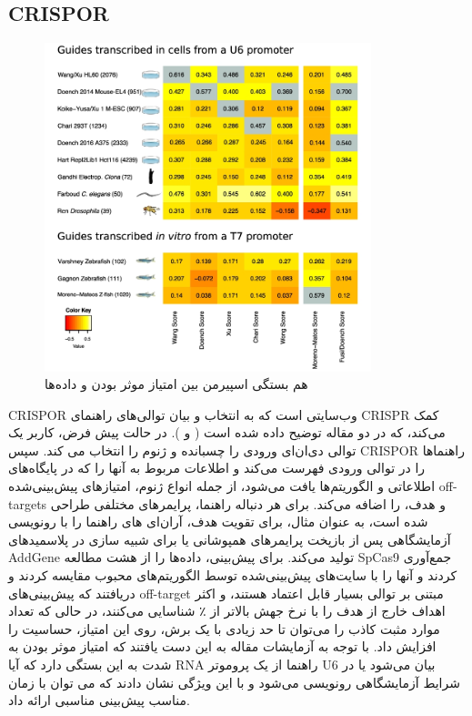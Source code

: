 \documentclass[12pt,a4paper,BCOR=.7cm,headsepline,bibliography=totoc]{report}
\begin{document}
\subsection{CRISPOR~\cite{CRISPOR}}
\begin{figure}
\centering
\includegraphics[width=9.5cm, ]{pictures/CRISPOR.jpg}
\caption{
هم بستگی اسپیرمن بین امتیاز موثر بودن و داده‌ها	\cite{CRISPOR}
}\label{wrap-fig:4}
\end{figure}
CRISPOR
 وب‌سایتی است که به انتخاب و بیان توالی‌های راهنمای CRISPR کمک می‌کند، که در دو مقاله توضیح داده شده است (  و  ). در حالت پیش فرض، کاربر یک توالی دی‌ان‌ای ورودی را چسبانده و ژنوم را انتخاب می کند. سپس CRISPOR راهنماها را در توالی ورودی فهرست می‌کند و اطلاعات مربوط به آنها را که در پایگاه‌های اطلاعاتی و الگوریتم‌ها یافت می‌شود، از جمله انواع ژنوم، امتیازهای پیش‌بینی‌شده off-targets و هدف، را اضافه می‌کند. برای هر دنباله راهنما، پرایمرهای مختلفی طراحی شده است، به عنوان مثال، برای تقویت هدف، آر‌ان‌ای های راهنما را با رونویسی آزمایشگاهی پس از بازپخت پرایمرهای همپوشانی یا برای شبیه سازی در پلاسمیدهای AddGene تولید می‌کند.
برای پیش‌بینی، داده‌ها را از هشت مطالعه  SpCas9 جمع‌آوری کردند و آنها را با سایت‌های پیش‌بینی‌شده توسط الگوریتم‌های محبوب مقایسه کردند و دریافتند که پیش‌بینی‌های off-target مبتنی بر توالی بسیار قابل اعتماد هستند، و اکثر اهداف خارج از هدف را با نرخ جهش بالاتر از ٪ شناسایی می‌کنند، در حالی که تعداد موارد مثبت کاذب را می‌توان تا حد زیادی با یک برش، روی این امتیاز، حساسیت را افزایش داد. با توجه به آزمایشات مقاله به این دست یافتند که امتیاز موثر بودن به شدت به این بستگی دارد که آیا RNA راهنما از یک پروموتر U6 بیان می‌شود یا در شرایط آزمایشگاهی رونویسی می‌شود و با این ویژگی نشان دادند که می توان با زمان مناسب پیش‌بینی مناسبی ارائه داد.
\end{document}
